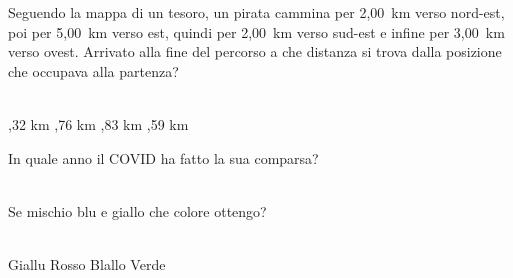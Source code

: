 \documentclass[a4paper,11pt]{exam}
\begin{document}
\begin{questions}
    
\question Seguendo la mappa di un tesoro, un pirata cammina per 2,00~km verso nord-est, poi per 5,00~km verso est, quindi per 2,00~km verso sud-est e infine per 3,00~km verso ovest. Arrivato alla fine del percorso a che distanza si trova dalla posizione che occupava alla partenza?\\\
\begin{oneparchoices}
  ,32 km
  ,76 km
  ,83 km
  \choice 4,59 km
\end{oneparchoices}

    
\question In quale anno il COVID ha fatto la sua comparsa?\\\
\begin{oneparchoices}
  \choice 2020
\end{oneparchoices}

    
\question Se mischio blu e giallo che colore ottengo?\\\
\begin{oneparchoices}
  \choice Giallu
  \choice Rosso
  \choice Blallo
  \choice Verde
\end{oneparchoices}

    
\end{questions}

    
    \newpage
    
    
\end{document}

